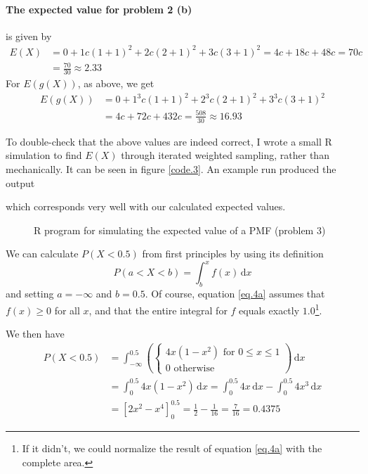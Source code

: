 \documentclass[a4paper,english,12pt]{article}
\begin{document}
\paragraph{The expected value for problem 2 (b)} is given by
\begin{align*}
  E(X) &=
    0 +
    1 c(1+1)^2 +
    2 c(2+1)^2 +
    3 c(3+1)^2 =
    4c + 18c + 48c = 70c \\
    &= \frac{70}{30} \approx 2.33
\end{align*}
For $E(g(X))$, as above, we get
\begin{align*}
  E(g(X)) &=
    0 +
    1^3 c(1+1)^2 +
    2^3 c(2+1)^2 +
    3^3 c(3+1)^2 \\
    &=  4c + 72c + 432c = \frac{508}{30} \approx 16.93
\end{align*}

To double-check that the above values are indeed correct, I wrote a small R
simulation to find $E(X)$ through iterated weighted sampling, rather than
mechanically. It can be seen in figure \vref{code.3}.
%
An example run produced the output

which corresponds very well with our calculated expected values.

\begin{figure}[t]
  
  \caption{R program for simulating the expected value of a PMF (problem 3)}
  \label{code.3}
\end{figure}


We can calculate $P(X < 0.5)$ from first principles by using its definition
\begin{equation}
  \label{eq.4a}
  P(a < X < b) = \int_b^x{f(x)\, \mathrm{d} x}
\end{equation} and setting $a=-\infty$ and $b=0.5$.
Of course, equation \vref{eq.4a} assumes that $f(x) \geqslant 0$ for all $x$,
and that the entire integral for $f$ equals exactly $1.0$\footnote{If it
didn't, we could normalize the result of equation \vref{eq.4a} with the
complete area.}.

We then have
\begin{align*}
  P(X < 0.5) &= \int_{-\infty}^{0.5} \left(
    \begin{cases}
      4x(1-x^2) \textrm{ for } 0 \leqslant x \leqslant 1 \\
      0 \textrm{ otherwise}
    \end{cases}\right)\, \mathrm{d} x \\
  &=
    \int_0^{0.5} 4x(1-x^2)\, \mathrm{d} x =
    \int_0^{0.5} 4x\, \mathrm{d} x - \int_0^{0.5} 4x^3\, \mathrm{d} x \\
  &=
    \left[2x^2 - x^4 \right]_0^{0.5}
  = \frac{1}{2} - \frac{1}{16} = \frac{7}{16} = 0.4375
\end{align*}
\end{document}
